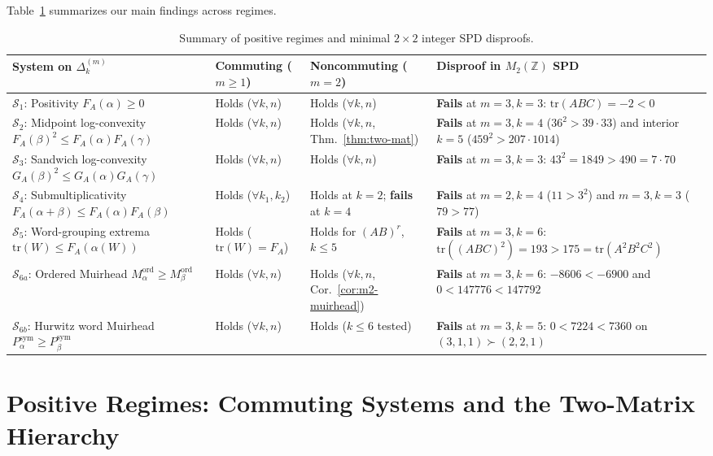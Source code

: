 \documentclass[11pt,a4paper]{article}
\theoremstyle{definition}
\theoremstyle{remark}
\newcommand{\tr}{\mathrm{tr}}
\newcommand{\DeltaLat}{\Delta}
\newcommand{\Mord}{M^{\mathrm{ord}}}
\newcommand{\Psym}{P^{\mathrm{sym}}}
\begin{document}
Table~\ref{tab:summary} summarizes our main findings across regimes.

\begin{table}[ht]
\centering
\small
\renewcommand{\arraystretch}{1.22}
\begin{tabular}{@{}p{3.6cm}p{2.1cm}p{3.3cm}p{4.8cm}@{}}
\toprule
\textbf{System on $\DeltaLat_k^{(m)}$} & \textbf{Commuting} ($m \ge 1$) & \textbf{Noncommuting} ($m = 2$) & \textbf{Disproof in $M_2(\mathbb{Z})$ SPD} \\
\midrule
$\mathcal{S}_1$: Positivity $F_A(\alpha) \ge 0$ & Holds ($\forall k,n$) & Holds ($\forall k,n$) & \textbf{Fails} at $m=3, k=3$: $\tr(ABC) = -2 < 0$ \\
$\mathcal{S}_2$: Midpoint log-convexity $F_A(\beta)^2 \le F_A(\alpha)F_A(\gamma)$ & Holds ($\forall k,n$) & Holds ($\forall k,n$, Thm.~\ref{thm:two-mat}) & \textbf{Fails} at $m=3, k=4$ ($36^2 > 39\cdot 33$) and interior $k=5$ ($459^2 > 207\cdot 1014$) \\
$\mathcal{S}_3$: Sandwich log-convexity $G_A(\beta)^2 \le G_A(\alpha)G_A(\gamma)$ & Holds ($\forall k,n$) & Holds ($\forall k,n$) & \textbf{Fails} at $m=3, k=3$: $43^2 = 1849 > 490 = 7\cdot 70$ \\
$\mathcal{S}_4$: Submultiplicativity $F_A(\alpha+\beta) \le F_A(\alpha)F_A(\beta)$ & Holds ($\forall k_1,k_2$) & Holds at $k=2$; \textbf{fails} at $k=4$ & \textbf{Fails} at $m=2, k=4$ ($11 > 3^2$) and $m=3, k=3$ ($79 > 77$) \\
$\mathcal{S}_5$: Word-grouping extrema $\tr(W) \le F_A(\alpha(W))$ & Holds ($\tr(W)=F_A$) & Holds for $(AB)^r$, $k \le 5$ & \textbf{Fails} at $m=3, k=6$: $\tr((ABC)^2)=193 > 175 = \tr(A^2 B^2 C^2)$ \\
$\mathcal{S}_{6a}$: Ordered Muirhead $\Mord_\alpha \ge \Mord_\beta$ & Holds ($\forall k,n$) & Holds ($\forall k,n$, Cor.~\ref{cor:m2-muirhead}) & \textbf{Fails} at $m=3, k=6$: $-8606 < -6900$ and $0 < 147776 < 147792$ \\
$\mathcal{S}_{6b}$: Hurwitz word Muirhead $\Psym_\alpha \ge \Psym_\beta$ & Holds ($\forall k,n$) & Holds ($k \le 6$ tested) & \textbf{Fails} at $m=3, k=5$: $0 < 7224 < 7360$ on $(3,1,1)\succ(2,2,1)$ \\
\bottomrule
\end{tabular}
\caption{Summary of positive regimes and minimal $2 \times 2$ integer SPD disproofs.}\label{tab:summary}
\end{table}

\section{Positive Regimes: Commuting Systems and the Two-Matrix Hierarchy}
\end{document}
